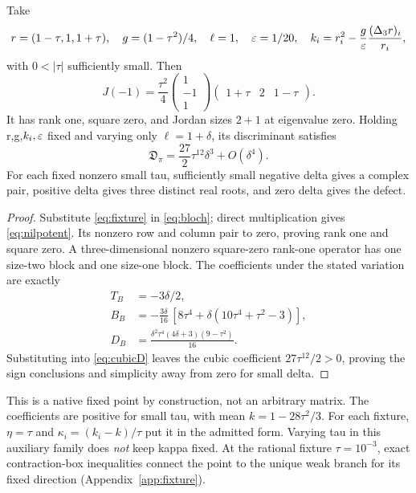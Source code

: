 \begin{theorem}\label{thm:nilpotent}
Take
\begin{equation}
r=(1-\tau,1,1+\tau),\quad g=(1-\tau^2)/4,\quad
\ell=1,\quad \varepsilon=1/20,\quad
k_i=r_i^2-\frac g{\varepsilon}\frac{(\Delta_3r)_i}{r_i},\label{eq:fixture}
\end{equation}
with \(0<|\tau|\) sufficiently small. Then
\begin{equation}
\boxed{J(-1)=\frac{\tau^2}{4}
\begin{pmatrix}1\\-1\\1\end{pmatrix}
\begin{pmatrix}1+\tau&2&1-\tau\end{pmatrix}.}\label{eq:nilpotent}
\end{equation}
It has rank one, square zero, and Jordan sizes \(2+1\) at eigenvalue zero. Holding r,g,\(k_i,\varepsilon\) fixed and varying only \(\ell=1+\delta\), its discriminant satisfies
\begin{equation}
\mathfrak D_\pi=\frac{27}{2}\tau^{12}\delta^3+O(\delta^4).\label{eq:unfold}
\end{equation}
For each fixed nonzero small tau, sufficiently small negative delta gives a complex pair, positive delta gives three distinct real roots, and zero delta gives the defect.
\end{theorem}
\begin{proof}
Substitute \eqref{eq:fixture} in \eqref{eq:bloch}; direct multiplication gives \eqref{eq:nilpotent}. Its nonzero row and column pair to zero, proving rank one and square zero. A three-dimensional nonzero square-zero rank-one operator has one size-two block and one size-one block. The coefficients under the stated variation are exactly
\begin{align}
T_B&=-3\delta/2,\\
B_B&=-\frac{3\delta}{16}\,[8\tau^4+\delta(10\tau^4+\tau^2-3)],\\
D_B&=\frac{\delta^2\tau^4(4\delta+3)(9-\tau^2)}{16}.\label{eq:unfoldcoeff}
\end{align}
Substituting into \eqref{eq:cubicD} leaves the cubic coefficient \(27\tau^{12}/2>0\), proving the sign conclusions and simplicity away from zero for small delta.
\end{proof}

This is a native fixed point by construction, not an arbitrary matrix. The coefficients are positive for small tau, with mean \(k=1-28\tau^2/3\). For each fixture, \(\eta=\tau\) and \(\kappa_i=(k_i-k)/\tau\) put it in the admitted form. Varying tau in this auxiliary family does \emph{not} keep kappa fixed. At the rational fixture \(\tau=10^{-3}\), exact contraction-box inequalities connect the point to the unique weak branch for its fixed direction (Appendix~\ref{app:fixture}).

